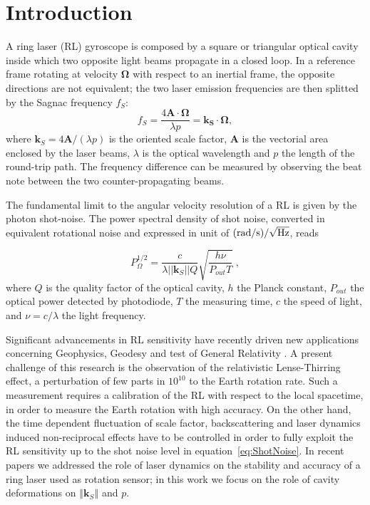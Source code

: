 \documentclass[12pt,a4paper,final]{iopart}
\begin{document}
\section{Introduction}
A ring laser (RL) gyroscope is composed by a square or triangular
optical cavity inside which two opposite light beams propagate in a closed loop. In a reference frame rotating at velocity $\mathbf{\Omega}$ with respect to an inertial frame, the opposite directions are not
equivalent; the two laser emission frequencies are then splitted by the Sagnac
frequency $f_{S}$:
\begin{equation}
f_S=\frac{4 \mathbf{A}\cdot \mathbf{\Omega}}{\lambda p}=\mathbf{k_S} \cdot \mathbf{\Omega},
\end{equation}
where $\mathbf{k}_{S}=4\mathbf{A}/(\lambda p)$ is the oriented scale
factor, $\mathbf{A}$ is the vectorial area enclosed by the laser beams, $\lambda$ is the optical wavelength and $p$ the length of the round-trip path. 
The frequency difference can be measured by observing the beat note between the two counter-propagating beams. 

The fundamental limit to the angular velocity resolution of a RL is given by the photon shot-noise. 
The power spectral density of shot noise, converted in equivalent rotational noise and expressed
in unit of $\rm{(rad/s)/\sqrt{Hz}}$, reads \cite{StedmanShot}

\begin{equation}
P_{\Omega}^{1/2}=\frac{c}{\lambda || \mathbf{k}_{S} || Q}\sqrt{\frac{h\nu}{P_{out}T}}\;,\label{eq:ShotNoise} 
\end{equation}
where $Q$ is the quality factor of the optical cavity, 
$h$ the Planck constant, $P_{out}$ the optical power detected by photodiode,
$T$ the measuring time, $c$ the speed of light, and $\nu=c/\lambda$
the light frequency. 

Significant advancements in RL sensitivity have recently driven new
applications concerning Geophysics, Geodesy and test of General Relativity \cite{ullireview,JapanEarthquake,G-Chandler, PRD2011}.
A present challenge of this research is the observation of the relativistic Lense-Thirring effect, a perturbation 
of few parts in $10^{10}$ to the Earth rotation rate. Such a measurement requires a calibration of the RL with respect to the local spacetime, in order
to measure the Earth rotation with high accuracy. 
On the other hand, the time dependent fluctuation of scale factor, backscattering
and laser dynamics induced non-reciprocal effects have to be controlled in order to fully exploit the RL sensitivity up
to the shot noise level in equation~\ref{eq:ShotNoise}. In recent papers \cite{Cuccato,Beghi} we addressed the role of laser dynamics on the stability and accuracy 
of a ring laser
used as rotation sensor; in this work we focus on the role of cavity deformations 
on $\left\Vert \mathbf{k}_{S}\right\Vert $ and $p$.
\end{document}
